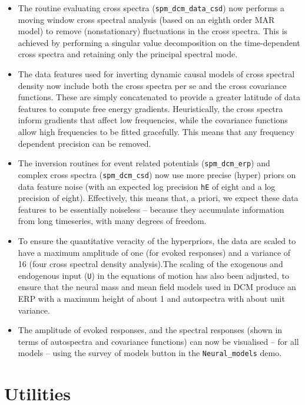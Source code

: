 \documentclass[a4paper,titlepage,openany]{article}
\begin{document}
\begin{multicols}{2}
\begin{itemize}
\item The routine evaluating cross spectra (\texttt{spm\_dcm\_data\_csd}) now performs a moving window cross spectral analysis (based on an eighth order MAR model) to remove (nonstationary) fluctuations in the cross spectra. This is achieved by performing a singular value decomposition on the time-dependent cross spectra and retaining only the principal spectral mode.
\item The data features used for inverting dynamic causal models of cross spectral density now include both the cross spectra per se and the cross covariance functions. These are simply concatenated to provide a greater latitude of data features to compute free energy gradients. Heuristically, the cross spectra inform gradients that affect low frequencies, while the covariance functions allow high frequencies to be fitted gracefully. This means that any frequency dependent precision can be removed.
\item The inversion routines for event related potentials (\texttt{spm\_dcm\_erp}) and complex cross spectra (\texttt{spm\_dcm\_csd}) now use more precise (hyper) priors on data feature noise (with an expected log precision \texttt{hE} of eight and a log precision of eight). Effectively, this means that, a priori, we expect these data features to be essentially noiseless -- because they accumulate information from long timeseries, with many degrees of freedom.
\item To ensure the quantitative veracity of the hyperpriors, the data are scaled to have a maximum amplitude of one (for evoked responses) and a variance of 16 (four cross spectral density analysis).The scaling of the exogenous and endogenous input (\texttt{U}) in the equations of motion has also been adjusted, to ensure that the neural mass and mean field models used in DCM produce an ERP with a maximum height of about 1 and autospectra with about unit variance.
\item The amplitude of evoked responses, and the spectral responses (shown in terms of autospectra and covariance functions) can now be visualised -- for all models -- using the survey of models button in the \texttt{Neural\_models} demo.
\end{itemize}

\section{Utilities}


\end{multicols}
\end{document}
